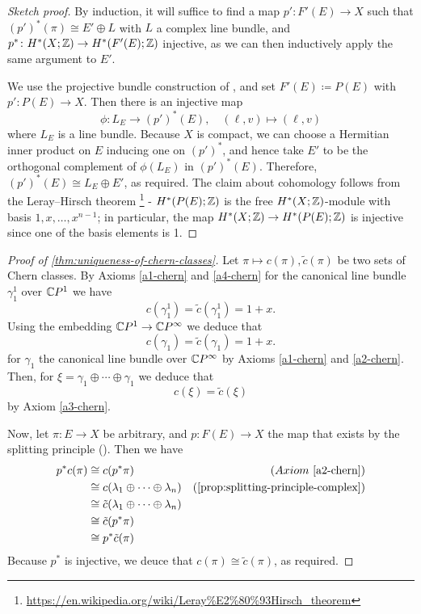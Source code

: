 \documentclass[ma3408.tex]{subfiles}
\begin{document}
\begin{proof}[Sketch proof]
By induction, it will suffice to find a map $p' \colon F'(E) \to X$ such that $(p')^*(\pi) \cong E' \oplus L$ with $L$ a complex line bundle, and $p^* \colon H^*(X;\mathbb{Z}) \to H^*(F'(E);\mathbb{Z})$ injective, as we can then inductively apply the same argument to $E'$. 

We use the projective bundle construction of , and set $F'(E) \coloneqq P(E)$ with $p' \colon P(E) \to X$. Then there is an injective map
\[
\phi \colon L_E \to (p')^*(E), \quad (\ell,v) \mapsto (\ell,v)
\]
where $L_E$ is a line bundle. Because $X$ is compact, we can choose a Hermitian inner product on $E$ inducing one on $(p')^*$, and hence take $E'$ to be the orthogonal complement of $\phi(L_E)$ in $(p')^*(E)$. Therefore, $(p')^*(E) \cong L_E \oplus E'$, as required. The claim about cohomology follows from the Leray--Hirsch theorem \footnote{\url{https://en.wikipedia.org/wiki/Leray\%E2\%80\%93Hirsch_theorem}} - $H^*(P(E);\mathbb{Z})$ is the free $H^*(X;\mathbb{Z})$-module with basis $1,x,\ldots,x^{n-1}$; in particular, the map $H^*(X;\mathbb{Z}) \to H^*(P(E);\mathbb{Z})$ is injective since one of the basis elements is 1. 
\end{proof}
\begin{proof}[Proof of \cref{thm:uniqueness-of-chern-classes}]
Let $\pi \mapsto c(\pi),\tilde c(\pi)$ be two sets of Chern classes. By Axioms \ref{a1-chern} and \ref{a4-chern} for the canonical line bundle $\gamma^1_1$ over $\mathbb{C} P^1$ we have
\[
c(\gamma^1_1) = \tilde c(\gamma^1_1) = 1+x. 
\]
Using the embedding $\mathbb{C} P^{1} \to \mathbb{C} P^{\infty}$ we deduce that
\[
c(\gamma_1) = \tilde c(\gamma_1) = 1+x. 
\]
for $\gamma_1$ the canonical line bundle over $\mathbb{C} P^{\infty}$ by Axioms \ref{a1-chern} and \ref{a2-chern}. Then, for $\xi = \gamma_1 \oplus \cdots \oplus \gamma_1$ we deduce that
\[
c(\xi) = \tilde c(\xi)
\]
by Axiom \ref{a3-chern}. 

Now, let $\pi \colon E \to X$ be arbitrary, and $p \colon F(E) \to X$ the map that exists by the splitting principle (). Then we have
\begin{align*}
p^*c(\pi) & \cong c(p^*\pi)  & (Axiom~\ref{a2-chern}) \\
&\cong c(\lambda_1 \oplus \cdots \oplus \lambda_n) & (\Cref{prop:splitting-principle-complex}) \\
& \cong \tilde c(\lambda_1 \oplus \cdots \oplus \lambda_n) \\
& \cong \tilde c(p^*\pi) & \\
& \cong p^* \tilde c(\pi)
\end{align*} 
Because $p^*$ is injective, we deuce that $c(\pi) \cong \tilde c(\pi)$, as required. 
\end{proof}
\end{document}
